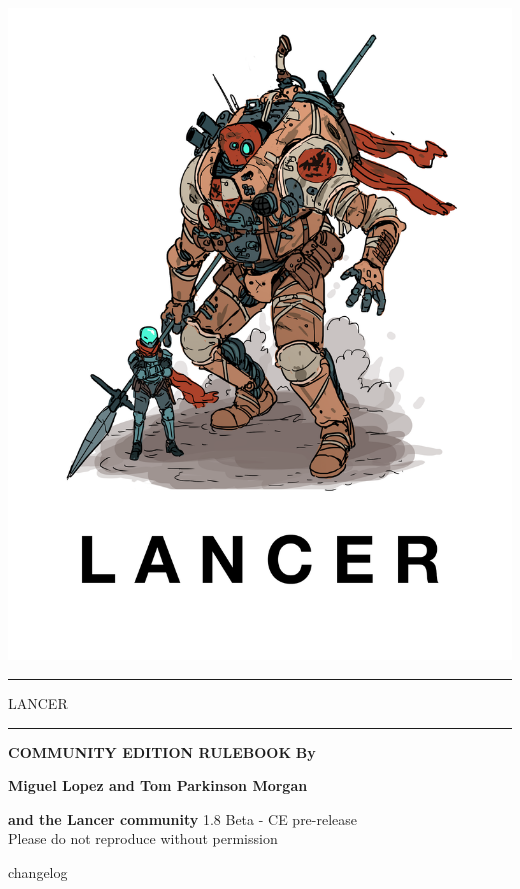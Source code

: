 \documentclass[11pt]{report}
\begin{document}
\setcounter{secnumdepth}{-2}
\setcounter{tocdepth}{7}

\pagestyle{empty}
\begin{center}
  \includegraphics{Cover}
\end{center}

\newpage
\pagestyle{plain}
\begin{titlepage}
\begin{center}
\par\noindent\rule[1cm]{0.78\textwidth}{3mm}
{\fontsize{96}{115}\selectfont LANCER}
\vspace{1cm}
\par\noindent\rule{0.78\textwidth}{3mm}
\vfill
\huge\textbf{COMMUNITY EDITION RULEBOOK}
\vfill
\normalsize\textbf{By}

\textbf{Miguel Lopez and Tom Parkinson Morgan}

\textbf{and the Lancer community}
\vfill
1.8 Beta - CE pre-release\\
Please do not reproduce without permission\\
\end{center}
\end{titlepage}
{changelog}
\end{document}
